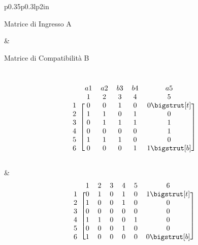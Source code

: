 \begin{center}
    \begin{tabular}{p{}p{}lp{2in}}
        \begin{center}Matrice di Ingresso A\end{center} & \begin{center}Matrice di Compatibilità B\end{center}\\
        \[
        \begin{blockarray}{cccccc}
             & a1 & a2 & b3 & b4 & a5 \\
             & 1 & 2 & 3 & 4 & 5 \\
            \begin{block}{c[ccccc]}
                1 & 0 & 0 & 1 & 0 & 0\bigstrut[t] \\
                2 & 1 & 1 & 0 & 1 & 0 \\
                3 & 0 & 1 & 1 & 1 & 1 \\
                4 & 0 & 0 & 0 & 0 & 1 \\
                5 & 1 & 1 & 1 & 0 & 0 \\
                6 & 0 & 0 & 0 & 1 & 1\bigstrut[b]\\
            \end{block}
        \end{blockarray}\vspace*{-1.25\baselineskip}
        \]
        
        & 
        \[
        \begin{blockarray}{ccccccc}
             & 1 & 2 & 3 & 4 & 5 & 6\\
            \begin{block}{c[cccccc]}
                1 & 0 & 1 & 0 & 1 & 0 & 1\bigstrut[t] \\
                2 & 1 & 0 & 0 & 1 & 0 & 0\\
                3 & 0 & 0 & 0 & 0 & 0 & 0\\
                4 & 1 & 1 & 0 & 0 & 1 & 0\\
                5 & 0 & 0 & 0 & 1 & 0 & 0\\
                6 & 1 & 0 & 0 & 0 & 0 & 0\bigstrut[b]\\
            \end{block}
        \end{blockarray}\vspace*{-1.25\baselineskip}
        \] \\
    \end{tabular}
\end{center}

